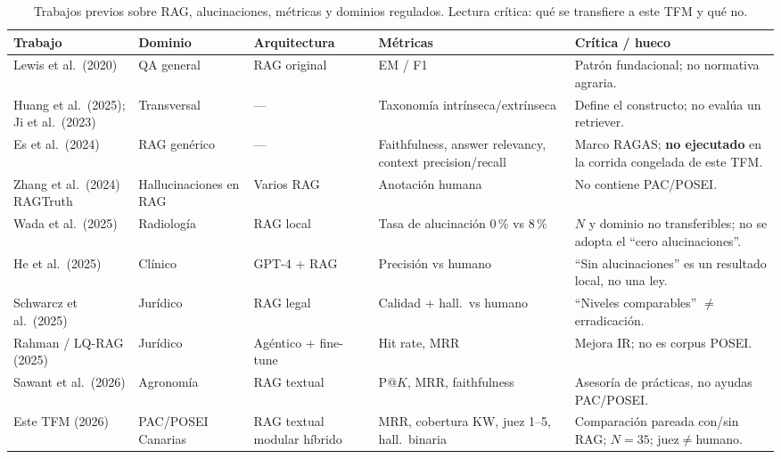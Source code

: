 \begin{table}[htbp]
\centering
\caption{Trabajos previos sobre RAG, alucinaciones, métricas y dominios regulados. Lectura crítica: qué se transfiere a este TFM y qué no.}
\label{tab:trabajos-previos}
\small
\begin{tabular}{p{2.3cm}p{2.0cm}p{2.4cm}p{3.4cm}p{3.6cm}}
\toprule
\textbf{Trabajo} & \textbf{Dominio} & \textbf{Arquitectura} & \textbf{Métricas} & \textbf{Crítica / hueco} \\
\midrule
Lewis et al.\ (2020) & QA general & RAG original & EM / F1 & Patrón fundacional; no normativa agraria. \\
Huang et al.\ (2025); Ji et al.\ (2023) & Transversal & --- & Taxonomía intrínseca/extrínseca & Define el constructo; no evalúa un retriever. \\
Es et al.\ (2024) & RAG genérico & --- & Faithfulness, answer relevancy, context precision/recall & Marco RAGAS; \textbf{no ejecutado} en la corrida congelada de este TFM. \\
Zhang et al.\ (2024) RAGTruth & Hallucinaciones en RAG & Varios RAG & Anotación humana & No contiene PAC/POSEI. \\
Wada et al.\ (2025) & Radiología & RAG local & Tasa de alucinación 0\,\% vs 8\,\% & $N$ y dominio no transferibles; no se adopta el ``cero alucinaciones''. \\
He et al.\ (2025) & Clínico & GPT-4 + RAG & Precisión vs humano & ``Sin alucinaciones'' es un resultado local, no una ley. \\
Schwarcz et al.\ (2025) & Jurídico & RAG legal & Calidad + hall.\ vs humano & ``Niveles comparables'' $\neq$ erradicación. \\
Rahman / LQ-RAG (2025) & Jurídico & Agéntico + fine-tune & Hit rate, MRR & Mejora IR; no es corpus POSEI. \\
Sawant et al.\ (2026) & Agronomía & RAG textual & P@$K$, MRR, faithfulness & Asesoría de prácticas, no ayudas PAC/POSEI. \\
Este TFM (2026) & PAC/POSEI Canarias & RAG textual modular híbrido & MRR, cobertura KW, juez 1--5, hall.\ binaria & Comparación pareada con/sin RAG; $N=35$; juez$\neq$humano. \\
\bottomrule
\end{tabular}
\end{table}

